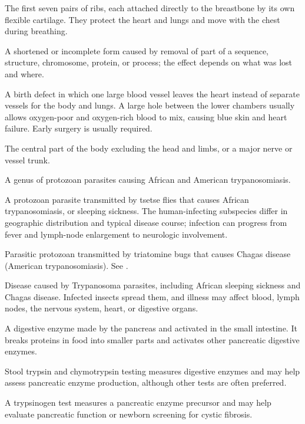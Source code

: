  The first seven pairs of ribs, each attached directly to the breastbone by its own flexible cartilage. They protect the heart and lungs and move with the chest during breathing.

 A shortened or incomplete form caused by removal of part of a sequence, structure, chromosome, protein, or process; the effect depends on what was lost and where.

 A birth defect in which one large blood vessel leaves the heart instead of separate vessels for the body and lungs. A large hole between the lower chambers usually allows oxygen-poor and oxygen-rich blood to mix, causing blue skin and heart failure. Early surgery is usually required.

 The central part of the body excluding the head and limbs, or a major nerve or vessel trunk.

 A genus of protozoan parasites causing African and American trypanosomiasis.

 A protozoan parasite transmitted by tsetse flies that causes African trypanosomiasis, or sleeping sickness.
The human-infecting subspecies differ in geographic distribution and typical disease
course; infection can progress from fever and lymph-node enlargement to neurologic
involvement.

 Parasitic protozoan transmitted by triatomine bugs that causes Chagas disease (American trypanosomiasis). See .

 Disease caused by Trypanosoma parasites, including African sleeping sickness and Chagas disease. Infected insects spread them, and illness may affect blood, lymph nodes, the nervous system, heart, or digestive organs.

 A digestive enzyme made by the pancreas and activated in the small intestine. It breaks proteins in food into smaller parts and activates other pancreatic digestive enzymes.

 Stool trypsin and chymotrypsin testing measures digestive enzymes and may help assess pancreatic enzyme production, although other tests are often preferred.

 A trypsinogen test measures a pancreatic enzyme precursor and may help evaluate pancreatic function or newborn screening for cystic fibrosis.

